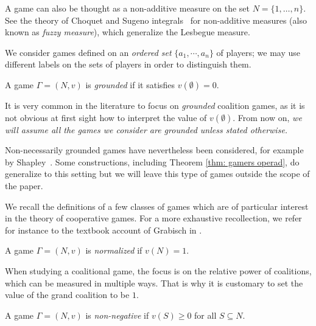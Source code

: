\documentclass[a4paper,12pt]{amsart}
\begin{document}
\begin{remark}
A game can also be thought as a non-additive measure on the set $N = \{1, \ldots, n\}$. See the theory of Choquet and Sugeno integrals~\cite{Grabisch} for non-additive measures (also known as \textit{fuzzy measure}), which generalize the Lesbegue measure. 
\end{remark}

\begin{remark}
We consider games defined on an \textit{ordered set} $\{a_1, \cdots,a_n\}$ of players; we may use different labels on the sets of players in order to distinguish them.
\end{remark}

\begin{definition}
A game $\Gamma = (N,v)$ is \textit{grounded} if it satisfies $v(\emptyset) = 0$.
\end{definition}

It is very common in the literature to focus on \textit{grounded} coalition games, as it is not obvious at first sight how to interpret the value of $v(\emptyset)$. From now on,\textit{ we will assume all the games we consider are grounded unless stated otherwise. }

\begin{remark}
Non-necessarily grounded games have nevertheless been considered, for example by Shapley~\cite{ShapleyCompoundIII}. Some constructions, including Theorem \ref{thm: gamers operad}, do generalize to this setting but we will leave this type of games outside the scope of the paper. 
\end{remark}

We recall the definitions of a few classes of games which are of particular interest in the theory of cooperative games. For a more exhaustive recollection, we refer for instance to the textbook account of Grabisch in \cite{Grabisch}. 

\begin{definition}
A game $\Gamma = (N, v)$ is \emph{normalized} if $v(N) = 1$. 
\end{definition}

When studying a coalitional game, the focus is on the relative power of coalitions, which can be measured in multiple ways. That is why it is customary to set the value of the grand coalition to be \(1\). 

\begin{definition}
A game $\Gamma = (N, v)$ is \emph{non-negative} if $v(S) \geq 0$ for all $S \subseteq N$. 
\end{definition}
\end{document}
